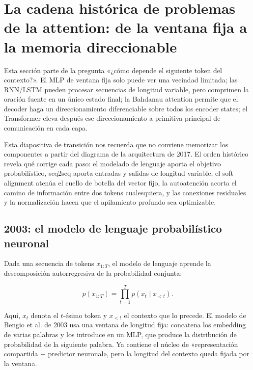 \section{La cadena histórica de problemas de la attention: de la ventana fija a la memoria direccionable}

Esta sección parte de la pregunta «¿cómo depende el siguiente token del contexto?». El MLP de ventana fija solo puede ver una vecindad limitada; las RNN/LSTM pueden procesar secuencias de longitud variable, pero comprimen la oración fuente en un único estado final; la Bahdanau attention permite que el decoder haga un direccionamiento diferenciable sobre todos los encoder states; el Transformer eleva después ese direccionamiento a primitiva principal de comunicación en cada capa.


Esta diapositiva de transición nos recuerda que no conviene memorizar los componentes a partir del diagrama de la arquitectura de 2017. El orden histórico revela qué corrige cada paso: el modelado de lenguaje aporta el objetivo probabilístico, seq2seq aporta entradas y salidas de longitud variable, el soft alignment atenúa el cuello de botella del vector fijo, la autoatención acorta el camino de información entre dos tokens cualesquiera, y las conexiones residuales y la normalización hacen que el apilamiento profundo sea optimizable.

\subsection{2003: el modelo de lenguaje probabilístico neuronal}

Dada una secuencia de tokens $x_{1:T}$, el modelo de lenguaje aprende la descomposición autorregresiva de la probabilidad conjunta:

\[
p(x_{1:T})=\prod_{t=1}^{T}p(x_t\mid x_{<t}).
\]

Aquí, $x_t$ denota el $t$-ésimo token y $x_{<t}$ el contexto que lo precede. El modelo de Bengio et al. de 2003 usa una ventana de longitud fija: concatena los embedding de varias palabras y los introduce en un MLP, que produce la distribución de probabilidad de la siguiente palabra. Ya contiene el núcleo de «representación compartida + predictor neuronal», pero la longitud del contexto queda fijada por la ventana.

